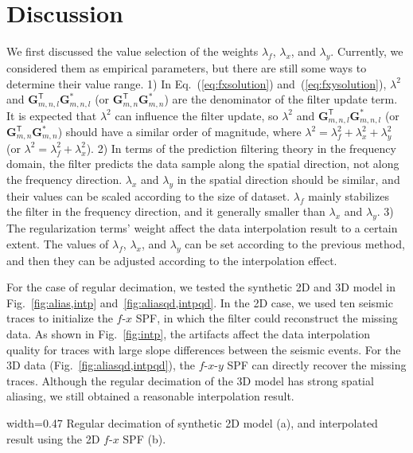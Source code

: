 \section{Discussion}

We first discussed the value selection of the weights $\lambda_{f}$,
$\lambda_{x}$, and $\lambda_{y}$.  Currently, we considered them as
empirical parameters, but there are still some ways to determine their
value range.  1) In Eq.~(\ref{eq:fxsolution})
and~(\ref{eq:fxysolution}), $\lambda^2$ and
$\mathbf{G}_{m,n,l}^{\mathsf{T}}\mathbf{G}_{m,n,l}^{*}$ (or
$\mathbf{G}_{m,n}^{\mathsf{T}}\mathbf{G}_{m,n}^{*}$) are the
denominator of the filter update term.  It is expected that
$\lambda^{2}$ can influence the filter update, so $\lambda^2$ and
$\mathbf{G}_{m,n,l}^{\mathsf{T}}\mathbf{G}_{m,n,l}^{*}$ (or
$\mathbf{G}_{m,n}^{\mathsf{T}}\mathbf{G}_{m,n}^{*}$) should have a
similar order of magnitude, where $\lambda^{2} =
\lambda_{f}^{2}+\lambda_{x}^{2}+\lambda_{y}^{2}$ (or $\lambda^{2} =
\lambda_{f}^{2}+\lambda_{x}^{2}$).  2) In terms of the prediction
filtering theory in the frequency domain, the filter predicts the data
sample along the spatial direction, not along the frequency
direction. $\lambda_{x}$ and $\lambda_{y}$ in the spatial direction
should be similar, and their values can be scaled according to the
size of dataset. $\lambda_{f}$ mainly stabilizes the filter in the
frequency direction, and it generally smaller than $\lambda_{x}$ and
$\lambda_{y}$.  3) The regularization terms' weight affect the data
interpolation result to a certain extent. The values of $\lambda_{f}$,
$\lambda_{x}$, and $\lambda_{y}$ can be set according to the previous
method, and then they can be adjusted according to the interpolation
effect.

For the case of regular decimation, we tested the synthetic 2D and 3D
model in Fig.~\ref{fig:alias,intp} and~\ref{fig:aliasqd,intpqd}.  In
the 2D case, we used ten seismic traces to initialize the $f$-$x$ SPF,
in which the filter could reconstruct the missing data.  As shown in
Fig.~\ref{fig:intp}, the artifacts affect the data interpolation
quality for traces with large slope differences between the seismic
events.  For the 3D data (Fig.~\ref{fig:aliasqd,intpqd}), the
$f$-$x$-$y$ SPF can directly recover the missing traces. Although the
regular decimation of the 3D model has strong spatial aliasing, we
still obtained a reasonable interpolation result.

 {width=0.47\columnwidth} {Regular decimation
  of synthetic 2D model (a), and interpolated result using the 2D
  $f$-$x$ SPF (b).}


